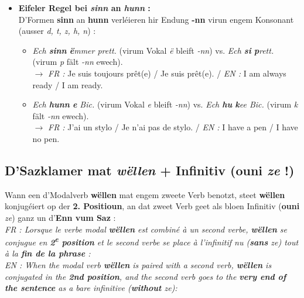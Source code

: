 \begin{itemize}
    \item \textbf{Eifeler Regel bei \textit{sinn} an \textit{hunn} :} \\
    D'Formen \textbf{sinn} an \textbf{hunn} verléieren hir Endung \textbf{-nn} virun engem Konsonant (ausser \textit{d, t, z, h, n}) :
    \begin{itemize}
        \item \textit{Ech \textbf{sinn} \textbf{ë}mmer prett.} (virum Vokal \textit{ë} bleift \textit{-nn}) vs. \textit{Ech \textbf{si} \textbf{p}rett.} (virum \textit{p} fält \textit{-nn} ewech). \\
        $\rightarrow$ \textit{FR :} Je suis toujours prêt(e) / Je suis prêt(e). / \textit{EN :} I am always ready / I am ready.
        \item \textit{Ech \textbf{hunn} \textbf{e} Bic.} (virum Vokal \textit{e} bleift \textit{-nn}) vs. \textit{Ech \textbf{hu} \textbf{k}ee Bic.} (virum \textit{k} fält \textit{-nn} ewech). \\
        $\rightarrow$ \textit{FR :} J'ai un stylo / Je n'ai pas de stylo. / \textit{EN :} I have a pen / I have no pen.
    \end{itemize}
\end{itemize}

\subsection{D'Sazklamer mat \textit{wëllen} + Infinitiv (ouni \textit{ze} !)}

Wann een d'Modalverb \textbf{wëllen} mat engem zweete Verb benotzt, steet \textbf{wëllen} konjugéiert op der \textbf{2. Positioun}, an dat zweet Verb geet als bloen Infinitiv (\textbf{ouni} \textit{ze}) ganz un d'\textbf{Enn vum Saz} : \\
\textit{FR : Lorsque le verbe modal \textbf{wëllen} est combiné à un second verbe, \textbf{wëllen} se conjugue en \textbf{2\textsuperscript{e} position} et le second verbe se place à l'infinitif nu (\textbf{sans} \textit{ze}) tout à la \textbf{fin de la phrase} :} \\
\textit{EN : When the modal verb \textbf{wëllen} is paired with a second verb, \textbf{wëllen} is conjugated in the \textbf{2nd position}, and the second verb goes to the \textbf{very end of the sentence} as a bare infinitive (\textbf{without} \textit{ze}):}

